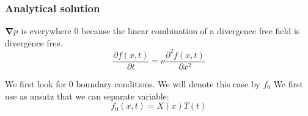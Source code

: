 \subsubsection{Analytical solution}

${\boldsymbol {\nabla}}p$ is everywhere 0 because the linear combination of a divergence free field is divergence free.
\begin{equation}
\frac{\partial f(x,t)}{\partial t}=\nu\frac{\partial^2 f(x,t)}{\partial x^2}
\end{equation}

We first look for 0 boundary conditions. We will denote this case by $f_0$
We first use as ansatz that we can separate variable:
\begin{equation}
 f_0(x,t)=X(x)T(t)
\end{equation}

